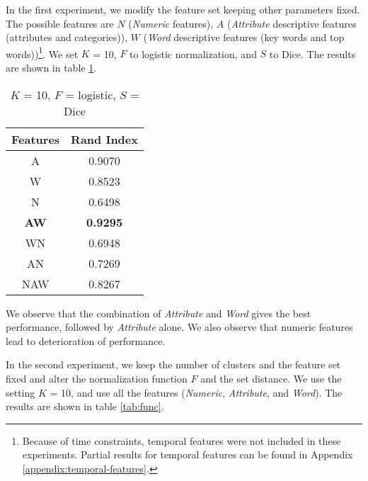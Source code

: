 \documentclass{article}
\begin{document}
In the first experiment, we modify the feature set keeping other parameters fixed.
The possible features are $N$ (\textit{Numeric} features), $A$ (\textit{Attribute} descriptive features (attributes and categories)), $W$ (\textit{Word} descriptive features (key words and top words))\footnote{Because of time constraints, temporal features were not included in these experiments. Partial results for temporal features can be found in Appendix \ref{appendix:temporal-features}.}.
We set $K$ = 10, $F$ to logistic normalization, and $S$ to Dice.
The results are shown in table \ref{tab:feature}.

\begin{table}
   \begin{center}
      \begin{tabular}{| c | c |}
         \hline
            Features & Rand Index \\
         \hline
            A & 0.9070 \\
            W & 0.8523 \\
            N & 0.6498 \\
            \textbf{AW} & \textbf{0.9295}\\
            WN & 0.6948 \\
            AN & 0.7269 \\
            NAW & 0.8267 \\
         \hline
      \end{tabular}
      \caption{$K$ = 10, $F$ = logistic, $S$ = Dice}
      \label{tab:feature}
   \end{center}
\end{table}

We observe that the combination of \textit{Attribute} and \textit{Word} gives the best performance, followed by \textit{Attribute} alone.
We also observe that numeric features lead to deterioration of performance.

In the second experiment, we keep the number of clusters and the feature set fixed and alter the normalization function $F$ and the set distance.
We use the setting $K$ = 10, and use all the features (\textit{Numeric}, \textit{Attribute}, and \textit{Word}).
The results are shown in table \ref{tab:func}. 
\end{document}
